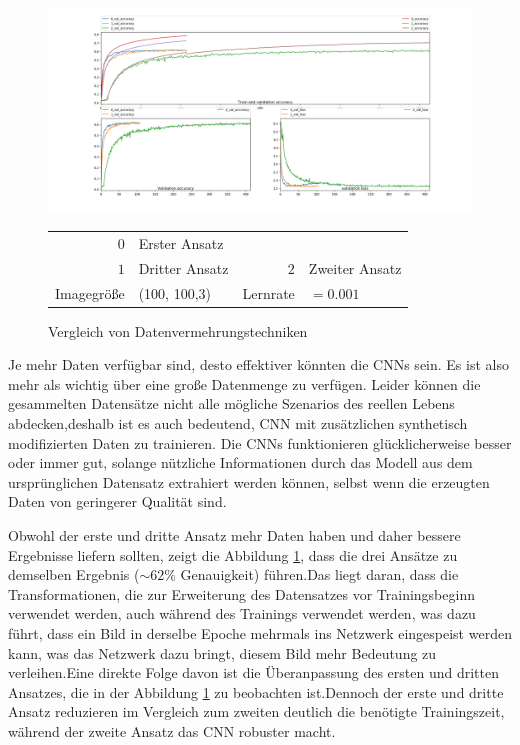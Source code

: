 \documentclass[12pt,a4paper]{scrartcl}
\numberwithin{equation}{section}
\begin{document}
\begin{figure}[h!]
	\centering
	\includegraphics[width=\textwidth]{DataAugmentation.png}
	\begin{center}
		\begin{tabular}{r@{: }l r@{: }l}
			$ 0 $& Erster Ansatz	& &	 \\
			$ 1 $ & Dritter Ansatz &	$ 2 $ & Zweiter Ansatz\\
			Imagegröße & (100, 100,3) &  Lernrate & $ =0.001 $
		\end{tabular}
		
	\end{center}
	\caption{ Vergleich von Datenvermehrungstechniken}
	\label{fig:DataAugmentation}
\end{figure}


Je mehr Daten verfügbar sind, desto effektiver könnten die \acsp{CNN} sein. Es ist also mehr als wichtig über eine große Datenmenge zu verfügen. Leider können die gesammelten Datensätze nicht alle mögliche Szenarios des reellen Lebens abdecken,deshalb ist es auch bedeutend, {CNN}  mit zusätzlichen synthetisch modifizierten Daten zu trainieren. Die {CNNs} funktionieren glücklicherweise besser oder immer gut, solange nützliche Informationen durch das Modell aus dem ursprünglichen Datensatz extrahiert werden können, selbst wenn die erzeugten Daten von geringerer Qualität sind.

Obwohl der erste und dritte Ansatz mehr Daten haben und daher bessere Ergebnisse liefern sollten, zeigt die Abbildung \ref{fig:DataAugmentation}, dass die drei Ansätze zu demselben Ergebnis ($ \sim 62\% $ Genauigkeit) führen.Das liegt daran, dass die Transformationen, die zur Erweiterung des Datensatzes vor Trainingsbeginn verwendet werden, auch während des Trainings verwendet werden, was dazu führt, dass ein Bild in derselbe Epoche mehrmals ins Netzwerk eingespeist werden kann, was das Netzwerk dazu bringt, diesem Bild mehr Bedeutung zu verleihen.Eine direkte Folge davon ist die Überanpassung des ersten und dritten Ansatzes, die in der Abbildung \ref{fig:DataAugmentation} zu beobachten ist.Dennoch der erste und dritte Ansatz reduzieren im Vergleich zum zweiten deutlich die benötigte Trainingszeit, während der zweite Ansatz das CNN robuster macht.
\end{document}
